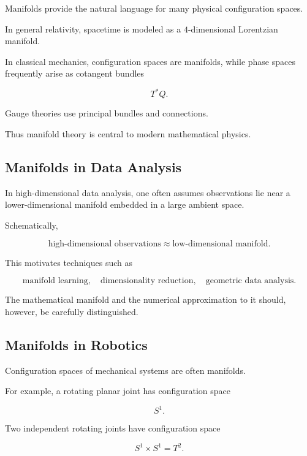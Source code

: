 Manifolds provide the natural language for many physical configuration
spaces.

In general relativity, spacetime is modeled as a \(4\)-dimensional
Lorentzian manifold.

In classical mechanics, configuration spaces are manifolds, while phase
spaces frequently arise as cotangent bundles

\[
\boxed{
T^*Q.
}
\]

Gauge theories use principal bundles and connections.

Thus manifold theory is central to modern mathematical physics.

\subsection{Manifolds in Data Analysis}
\label{subsec:manifolds-data-analysis}

In high-dimensional data analysis, one often assumes observations lie near a
lower-dimensional manifold embedded in a large ambient space.

Schematically,

\[
\boxed{
\text{high-dimensional observations}
\approx
\text{low-dimensional manifold}.
}
\]

This motivates techniques such as

\[
\boxed{
\text{manifold learning},
\quad
\text{dimensionality reduction},
\quad
\text{geometric data analysis}.
}
\]

The mathematical manifold and the numerical approximation to it should,
however, be carefully distinguished.

\subsection{Manifolds in Robotics}
\label{subsec:manifolds-robotics}

Configuration spaces of mechanical systems are often manifolds.

For example, a rotating planar joint has configuration space

\[
\boxed{
S^1.
}
\]

Two independent rotating joints have configuration space

\[
\boxed{
S^1\times S^1=T^2.
}
\]

